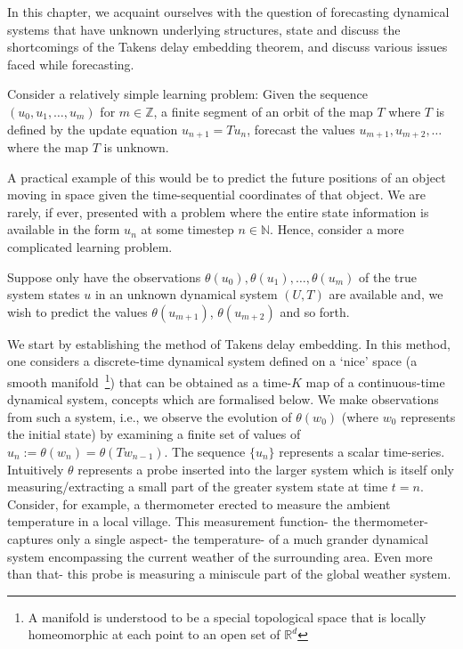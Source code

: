 In this chapter, we acquaint ourselves with the question of forecasting dynamical systems that have unknown underlying structures, state and discuss the shortcomings of the Takens delay embedding theorem, and discuss various issues faced while forecasting. 

Consider a relatively simple learning problem:
Given the sequence $(u_0, u_1, \ldots, u_m)$ for $m\in\mathbb{Z}$, a finite segment of an orbit of the map $T$ where $T$ is defined by the update equation $u_{n+1} = Tu_n$, forecast the values $u_{m+1}, u_{m+2}, \ldots$ where the map $T$ is unknown. 

A practical example of this would be to predict the future positions of an object moving in space given the time-sequential coordinates of that object. 
We are rarely, if ever, presented with a problem where the entire state information is available in the form $u_n$ at some timestep $n\in\mathbb{N}$.
Hence, consider a more complicated learning problem.

Suppose only have the observations $\theta(u_0), \theta(u_1), \ldots, \theta(u_m)$ of the true system states $u$ in an unknown dynamical system $(U,T)$ are available and, we wish to predict the values $\theta(u_{m+1})$, $\theta(u_{m+2})$ and so forth.

We start by establishing the method of Takens delay embedding. 
In this method, one considers a discrete-time dynamical system defined on a `nice' space 
(a smooth manifold~\footnote{A manifold is understood to be a special topological space that is locally homeomorphic at each point to an open set of $\mathbb{R}^d$})
that can be obtained as a time-$K$ map of a continuous-time dynamical system, concepts which are formalised below.
We make observations from such a system, i.e., we observe the evolution of $\theta(w_0)$ (where $w_0$ represents the initial state) by examining  a finite set of values of $u_n :=  \theta(w_n) = \theta(Tw_{n-1})$. The sequence $\{u_n\}$ represents a scalar time-series. Intuitively $\theta$ represents a probe inserted into the larger system which is itself only measuring/extracting a small part of the greater system state at time $t=n$. 
Consider, for example, a thermometer erected to measure the ambient temperature in a local village. This measurement function- the thermometer- captures only a single aspect- the temperature- of a much grander dynamical system encompassing the current weather of the surrounding area. Even more than that- this probe is measuring a miniscule part of the global weather system. 


